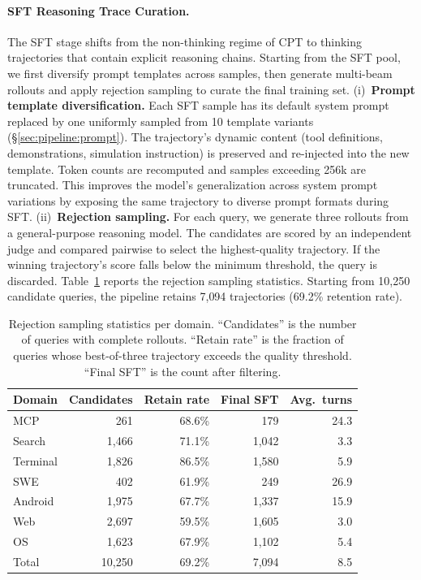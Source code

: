 \paragraph{SFT Reasoning Trace Curation.}
The SFT stage shifts from the non-thinking regime of CPT to thinking trajectories that contain explicit reasoning chains.
Starting from the SFT pool, we first diversify prompt templates across samples, then generate multi-beam rollouts and apply rejection sampling to curate the final training set.
(i)~\textbf{Prompt template diversification.}
Each SFT sample has its default system prompt replaced by one uniformly sampled from 10 template variants (\S\ref{sec:pipeline:prompt}).
The trajectory's dynamic content (tool definitions, demonstrations, simulation instruction) is preserved and re-injected into the new template.
Token counts are recomputed and samples exceeding 256k are truncated.
This improves the model's generalization across system prompt variations by exposing the same trajectory to diverse prompt formats during SFT.
(ii)~\textbf{Rejection sampling.}
For each query, we generate three rollouts from a general-purpose reasoning model.
The candidates are scored by an independent judge and compared pairwise to select the highest-quality trajectory.
If the winning trajectory's score falls below the minimum threshold, the query is discarded.
Table~\ref{tab:rejection_sampling} reports the rejection sampling statistics.
Starting from 10{,}250 candidate queries, the pipeline retains 7{,}094 trajectories (69.2\% retention rate).

\begin{table}[!ht]
\caption{Rejection sampling statistics per domain. ``Candidates'' is the number of queries with complete rollouts. ``Retain rate'' is the fraction of queries whose best-of-three trajectory exceeds the quality threshold. ``Final SFT'' is the count after filtering.}
\label{tab:rejection_sampling}
\centering
\small
\begin{tabular}{@{}lrrrr@{}}
\toprule
\textbf{Domain} & \textbf{Candidates} & \textbf{Retain rate} & \textbf{Final SFT} & \textbf{Avg.\ turns} \\
\midrule
MCP      & 261    & 68.6\% & 179     & 24.3 \\
Search   & 1{,}466 & 71.1\% & 1{,}042 & 3.3 \\
Terminal & 1{,}826 & 86.5\% & 1{,}580 & 5.9 \\
SWE      & 402    & 61.9\% & 249     & 26.9 \\
Android  & 1{,}975 & 67.7\% & 1{,}337 & 15.9 \\
Web      & 2{,}697 & 59.5\% & 1{,}605 & 3.0 \\
OS       & 1{,}623 & 67.9\% & 1{,}102 & 5.4 \\
\midrule
Total & 10{,}250 & 69.2\% & 7{,}094 & 8.5 \\
\bottomrule
\end{tabular}
\end{table}


